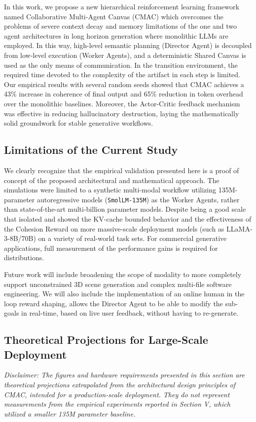\documentclass[pdflatex,sn-mathphys-num]{sn-jnl}
\begin{document}
In this work, we propose a new hierarchical reinforcement learning framework named Collaborative Multi-Agent Canvas (CMAC) which overcomes the problems of severe context decay and memory limitations of the one and two agent architectures in long horizon generation where monolithic LLMs are employed. In this way, high-level semantic planning (Director Agent) is decoupled from low-level execution (Worker Agents), and a deterministic Shared Canvas is used as the only means of communication. In the transition environment, the required time devoted to the complexity of the artifact in each step is limited. Our empirical results with several random seeds showed that CMAC achieves a 43\% increase in coherence of final output and 65\% reduction in token overhead over the monolithic baselines. Moreover, the Actor-Critic feedback mechanism was effective in reducing hallucinatory destruction, laying the mathematically solid groundwork for stable generative workflows. 

\subsection{Limitations of the Current Study}
We clearly recognize that the empirical validation presented here is a proof of concept of the proposed architectural and mathematical approach. The simulations were limited to a synthetic multi-modal workflow utilizing 135M-parameter autoregressive models (\texttt{SmolLM-135M}) as the Worker Agents, rather than state-of-the-art multi-billion parameter models. Despite being a good scale that isolated and showed the KV-cache bounded behavior and the effectiveness of the Cohesion Reward on more massive-scale deployment models (such as LLaMA-3-8B/70B) on a variety of real-world task sets. For commercial generative applications, full measurement of the performance gains is required for distributions.

Future work will include broadening the scope of modality to more completely support unconstrained 3D scene generation and complex multi-file software engineering. We will also include the implementation of an online human in the loop reward shaping, allows the Director Agent to be able to modify the sub-goals in real-time, based on live user feedback, without having to re-generate.

\subsection{Theoretical Projections for Large-Scale Deployment}
\textit{Disclaimer: The figures and hardware requirements presented in this section are theoretical projections extrapolated from the architectural design principles of CMAC, intended for a production-scale deployment. They do not represent measurements from the empirical experiments reported in Section V, which utilized a smaller 135M parameter baseline.}
\end{document}
